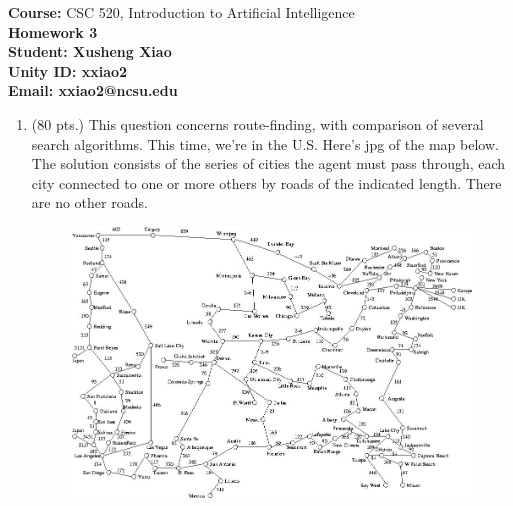 \documentclass{article}%
\begin{document}
\begin{flushleft}
\textbf{Course:} CSC 520, Introduction to Artificial Intelligence\\
\textbf{Homework 3}\\
\textbf{Student: Xusheng Xiao} \\
\textbf{Unity ID: xxiao2} \\
\textbf{Email: xxiao2@ncsu.edu}
\end{flushleft}

\noindent{\hrulefill}

\bigskip

\begin{enumerate}
	\item (80 pts.) This question concerns route-finding, with comparison of several search algorithms. This time, we're in the U.S. Here's jpg of the map below. The solution consists of the series of cities the agent must pass through, each city connected to one or more others by roads of the indicated length. There are no other roads. 
	
	\begin{figure}[h]
	\begin{center}
  	\includegraphics[scale=0.45]{map.jpg}
	\end{center}
	\end{figure} 
	

\end{enumerate}
\end{document}
